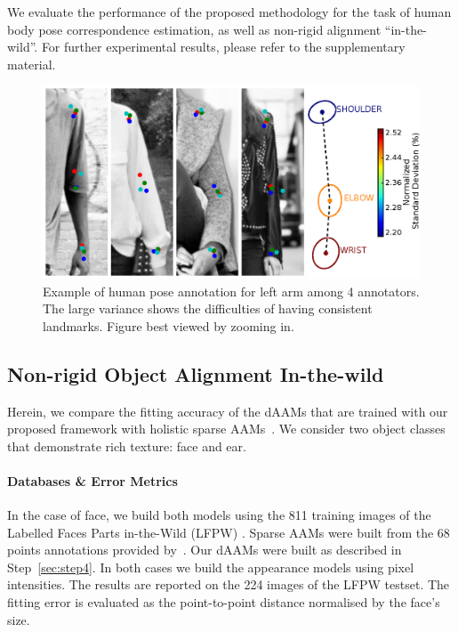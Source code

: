 
We evaluate the performance of the proposed methodology for the task of human body pose correspondence estimation, as well as non-rigid alignment ``in-the-wild''. For further experimental results, please refer to the supplementary material.


\begin{figure}[t!]
    \centering
    \includegraphics[width=\columnwidth]{resources/Fig_Variance/final}
    \caption{Example of human pose annotation for left arm among 4 annotators. The large variance shows the difficulties of having consistent landmarks. Figure best viewed by zooming in.}
    \label{fig:variance}
\end{figure}





\subsection{Non-rigid Object Alignment In-the-wild}
\label{exp:daam_benchmark}
Herein, we compare the fitting accuracy of the dAAMs that are trained with our proposed framework with holistic sparse AAMs~\cite{Cootes2001,Matthews2004}. We consider two object classes that demonstrate rich texture: face and ear.


\paragraph{Databases \& Error Metrics} In the case of face, we build both models using the 811 training images of the Labelled Faces Parts in-the-Wild (LFPW) \cite{belhumeur2013localizing}. Sparse AAMs were built from the 68 points annotations provided by~\cite{sagonas_iccv_300w_2013}. Our dAAMs were built as described in Step~\ref{sec:step4}. In both cases we build the appearance models using pixel intensities. The results are reported on the 224 images of the LFPW testset. The fitting error is evaluated as the point-to-point distance normalised by the face's size.


